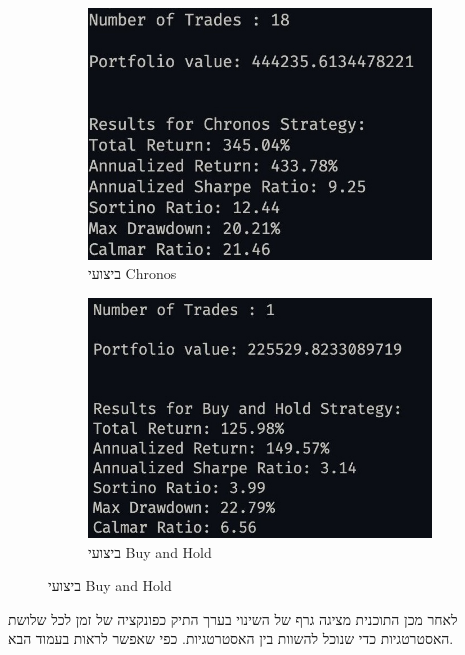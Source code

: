 \documentclass[a4paper,11pt]{article}
\newcommand{\te}[1]{\textenglish{#1}}
\begin{document}
\begin{RTL}
\begin{figure}[htbp]
    \centering
    \begin{subfigure}{0.45\textwidth}
        \centering
        \includegraphics[height=0.8\linewidth]{Results_output.jpeg}
        \caption{ביצועי \te{Chronos}}
        \label{fig:sub1}
    \end{subfigure}
    \hfill
    \begin{subfigure}{0.45\textwidth}
        \centering
        \includegraphics[height=0.8\linewidth]{Results_ouput2.jpeg}
        \caption{ביצועי \te{Buy and Hold}}
        \label{fig:sub2}
    \end{subfigure}
    \label{fig:figures}
\end{figure}
לאחר מכן התוכנית מציגה גרף של השינוי בערך התיק כפונקציה של זמן לכל שלושת האסטרטגיות כדי שנוכל להשוות בין האסטרטגיות. כפי שאפשר לראות בעמוד הבא.


\end{RTL}
\end{document}

